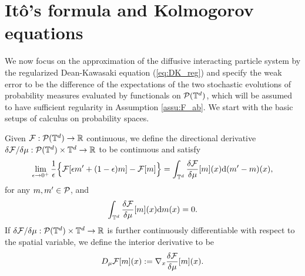 \section{It\^o's formula and Kolmogorov equations}\label{sec:ito-Kol}
We now focus on the approximation of the diffusive interacting particle system by the regularized Dean-Kawasaki equation (\ref{eq:DK_reg}) and specify the weak error to be the difference of the expectations of the two stochastic evolutions of probability measures evaluated by functionals on $\mathcal{P}(\mathbb{T}^d)$, which will be assumed to have sufficient regularity in Assumption \ref{assu:F_ab}. We start with the basic setups of calculus on probability spaces.

\begin{defi}Given $\mathcal{F}: \mathcal{P}(\mathbb{T}^d) \to \mathbb{R}$ continuous, we define the directional derivative $\delta \mathcal{F}/\delta \mu: \mathcal{P}(\mathbb{T}^d) \times \mathbb{T}^d \to \mathbb{R}$ to be continuous and satisfy 
\begin{equation}\label{eq:def_exterior_deriv}
    \lim_{\epsilon \to 0^+} \frac{1}{\epsilon} \Big\{\mathcal{F}[\epsilon m' + (1 - \epsilon)m ] - \mathcal{F}[m]\Big\}= \int_{\mathbb{T}^d} \frac{\delta \mathcal{F}}{\delta \mu}[m](x)  \mathrm{d}(m' - m)(x),
 \end{equation}
for any $m, m' \in \mathcal{P}$, and
\begin{equation}\label{eq:direc_normal}
\int_{\mathbb{T}^d}  \frac{\delta \mathcal{F}}{\delta \mu}[m](x)\mathrm{d}m(x) = 0.
\end{equation} 
If $\delta \mathcal{F} / \delta \mu : \mathcal{P}(\mathbb{T}^d) \times \mathbb{T}^d \to \mathbb{R}$ is further continuously differentiable with respect to the spatial variable, we define the interior derivative to be 
\begin{equation}\label{eq:def_wasser_deriv}
D_{\mu} \mathcal{F}[m](x) := \nabla_x \frac{\delta \mathcal{F}}{\delta \mu}[m](x).
\end{equation}
\end{defi}

